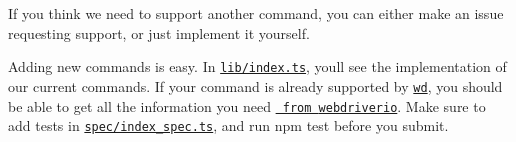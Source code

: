 If you think we need to support another command, you can either make an issue requesting support, or just implement it yourself.

Adding new commands is easy. In \href{lib/index.ts}{\texttt{ {\ttfamily lib/index.\+ts}}}, you\textquotesingle{}ll see the implementation of our current commands. If your command is already supported by \href{https://github.com/admc/wd}{\texttt{ {\ttfamily wd}}}, you should be able to get all the information you need \href{https://github.com/webdriverio/webdriverio/tree/master/lib/protocol}{\texttt{ from {\ttfamily webdriverio}}}. Make sure to add tests in \href{spec/index_spec.ts}{\texttt{ {\ttfamily spec/index\+\_\+spec.\+ts}}}, and run {\ttfamily npm test} before you submit. 